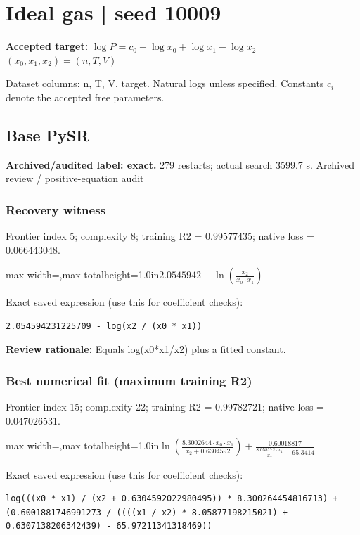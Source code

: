 \documentclass[10pt,letterpaper,landscape]{article}
\begin{document}
\section*{Ideal gas | seed 10009}
\textbf{Accepted target:} $\displaystyle \log P=c_0+\log x_0+\log x_1-\log x_2$\hfill $(x_0,x_1,x_2)=(n,T,V)$\par
{\small Dataset columns: n, T, V, target. Natural logs unless specified. Constants $c_i$ denote the accepted free parameters.}\par\medskip
\begin{minipage}[t]{0.485\textwidth}
\subsection*{Base PySR}
\textbf{Archived/audited label: exact.} 279 restarts; actual search 3599.7 s.
{\small Archived review / positive-equation audit}
\subsubsection*{Recovery witness}
Frontier index 5; complexity 8; training R2 = 0.99577435; native loss = 0.066443048.
\begin{center}\begin{adjustbox}{max width=\linewidth,max totalheight=1.0in}$\displaystyle 2.0545942 - \ln{\left(\frac{x_{2}}{x_{0} \cdot x_{1}} \right)}$\end{adjustbox}\end{center}
{\scriptsize Exact saved expression (use this for coefficient checks):}
\begin{lstlisting}
2.054594231225709 - log(x2 / (x0 * x1))
\end{lstlisting}
{\small\textbf{Review rationale:} Equals log(x0*x1/x2) plus a fitted constant.}
\subsubsection*{Best numerical fit (maximum training R2)}
Frontier index 15; complexity 22; training R2 = 0.99782721; native loss = 0.047026531.
\begin{center}\begin{adjustbox}{max width=\linewidth,max totalheight=1.0in}$\displaystyle \ln{\left(\frac{8.3002644 \cdot x_{0} \cdot x_{1}}{x_{2} + 0.6304592} \right)} + \frac{0.60018817}{\frac{8.058772 \cdot x_{1}}{x_{2}} - 65.3414}$\end{adjustbox}\end{center}
{\scriptsize Exact saved expression (use this for coefficient checks):}
\begin{lstlisting}
log(((x0 * x1) / (x2 + 0.6304592022980495)) * 8.300264454816713) + (0.6001881746991273 / ((((x1 / x2) * 8.05877198215021) + 0.6307138206342439) - 65.97211341318469))
\end{lstlisting}
\end{minipage}\hfill
\end{document}
